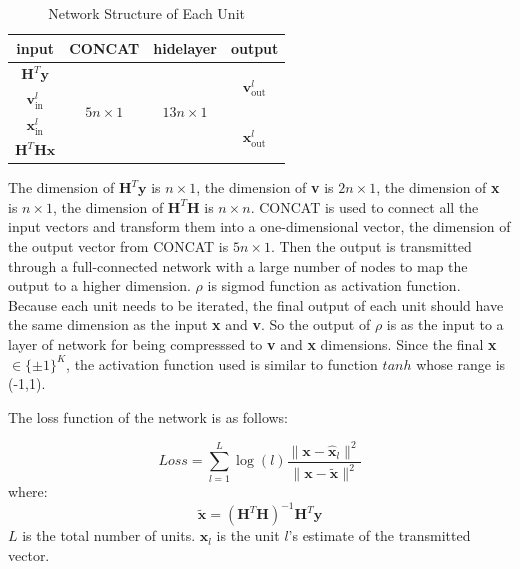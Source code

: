 \documentclass[conference]{IEEEtran}
\begin{document}


\begin{table}[!htbp]
\centering
\caption{Network Structure of Each Unit}
\label{unit}
\begin{tabular}{|c|c|c|c|}
\hline
input & CONCAT & hidelayer  & output \\
\hline
${\textbf{H}^{T}\textbf{y}}$ & \multirow{4}{*}{${5n \times 1}$} & \multirow{4}{*}{${13n \times 1}$} & \multirow{2}{*}{${\textbf{v}_\textrm{out}^l }$}  \\

\cline{1-1} ${\textbf{v}_{\textrm{in}}^l}$ & & & \\
\cline{1-1} \cline{4-4} ${\textbf{x}_\textrm{in}^l}$ & & &\multirow{2}{*}{${\textbf{x}_\textrm{out}^l }$} \\
\cline{1-1} ${\textbf{H}^{T}\textbf{H}\textbf{x}}$ & & & \\
\hline
\end{tabular}
\end{table}

The dimension of ${\textbf{H}^T\textbf{y}}$ is ${n \times 1}$, the dimension of \textbf{v} is ${2n \times 1}$, the dimension of \textbf{x} is ${n \times 1}$, the dimension of ${\textbf{H}^T\textbf{H}}$ is ${n \times n}$. CONCAT is used to connect all the input vectors and transform them into a one-dimensional vector, the dimension of the output vector from CONCAT is ${5n \times 1}$. Then the output is transmitted through a full-connected network with a large number of nodes to map the output to a higher dimension. $\rho$ is sigmod function as activation function. Because each unit needs to be iterated, the final output of each unit should have the same dimension as the input \textbf{x} and \textbf{v}. So the output of $\rho$ is as the input to a layer of network for being compresssed to \textbf{v} and \textbf{x} dimensions. Since the final \textbf{x}${\in\{\pm1\}^K}$, the activation function used is similar to function $tanh$ whose range is (-1,1).

The loss function of the network is as follows:

\begin{equation}
\label{lossFunction}
Loss=\sum_{l=1}^L\log\left(l\right)\frac{\|\textbf{x}-\hat{\textbf{x}}_l\|^2}{\|\textbf{x}-\widetilde{\textbf{x}}\|^2}
\end{equation}
where:
\begin{equation*}
\label{lossFunction}
\widetilde{\textbf{x}}=\left(\textbf{H}^T\textbf{H}\right)^{-1}\textbf{H}^T\textbf{y}
\end{equation*}
$L$ is the total number of units. ${\hat{\textbf{x}}_l}$ is the unit $l$'s estimate of the transmitted vector.
\end{document}
